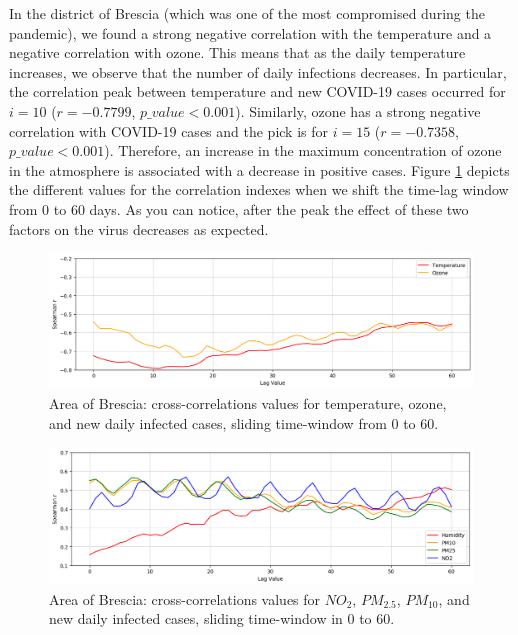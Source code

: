 \documentclass[review]{elsarticle}
\begin{document}
In the district of Brescia (which was one of the most compromised during the pandemic), we found a strong negative correlation with the temperature and a negative correlation with ozone. 
This means that as the daily temperature increases, we observe that the number of daily infections decreases. In particular, the correlation peak between temperature and new COVID-19 cases occurred for $i = 10$ ($ r = -0.7799$, $ p\_value < 0.001$).
Similarly, ozone has a strong negative correlation with COVID-19 cases and the pick is for $i = 15$ ($ r = -0.7358$, $p\_value < 0.001$). Therefore, an increase in the maximum concentration of ozone in the atmosphere is associated with a decrease in positive cases.
Figure \ref{fig:corr_brescia_in} depicts the different values for the correlation indexes when we shift the time-lag window from $0$ to $60$ days. As you can notice, after the peak the effect of these two factors on the virus decreases as expected.
\begin{figure}[htp]
	\centering
	\includegraphics[width=1\linewidth]{img/corr_temp_brescia.png}
	\caption{Area of Brescia: cross-correlations values for temperature, ozone, and new daily infected cases, sliding time-window from $0$ to $60$.}
	\label{fig:corr_brescia_in}
\end{figure}

\begin{figure}[htp]
	\centering
	\includegraphics[width=1\linewidth]{img/corr_pm_brescia.png}
	\caption{Area of Brescia: cross-correlations values for $NO_{2}$, $PM_{2.5}$, $PM_{10}$, and new daily infected cases, sliding time-window in $0$ to $60$.}
	\label{fig:corr_pm_brescia_in}
\end{figure}
\end{document}
